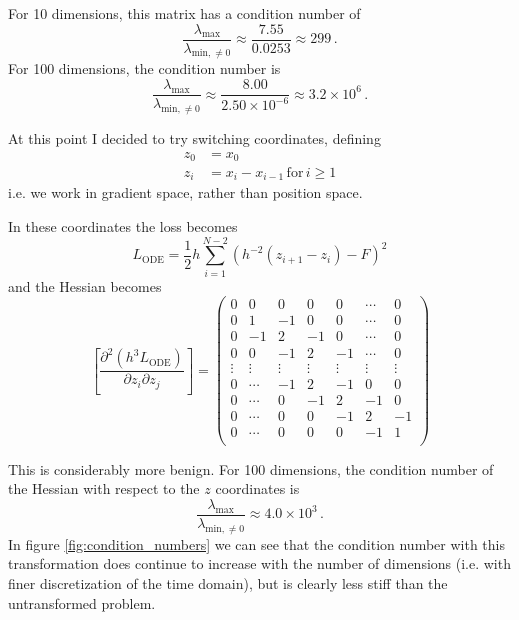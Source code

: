 \documentclass{article}
\begin{document}
For 10 dimensions, this matrix has a condition number of
$$
\frac{\lambda_{\mathrm{max}}}{\lambda_{\mathrm{min}, \ne 0}} \approx \frac{7.55}{0.0253} \approx 299 \,.
$$
For 100 dimensions, the condition number is
$$
\frac{\lambda_{\mathrm{max}}}{\lambda_{\mathrm{min}, \ne 0}} \approx \frac{8.00}{2.50\times 10^{-6}} \approx 3.2 \times 10^6 \,.
$$

At this point I decided to try switching coordinates, defining
\begin{align}
\label{eq:zdef}
z_0 & = x_0 \nonumber \\
z_i & = x_i - x_{i-1} \, \mathrm{for} \, i \ge 1 
\end{align}
i.e. we work in gradient space, rather than position space.

In these coordinates the loss becomes 
$$
L_{\mathrm{ODE}} = \frac{1}{2} h \sum_{i=1}^{N-2} \left( h^{-2}(z_{i+1} - z_i) - F \right)^2 
$$
and the Hessian becomes
$$
\left[\frac{\partial^2 (h^3 L_{\mathrm{ODE}})}{\partial z_i \partial z_j} \right] = \begin{pmatrix}
0 & 0 & 0 & 0 & 0 & \cdots & 0 \\
0 & 1 & -1 & 0 & 0 & \cdots & 0 \\
0 & -1 & 2 & -1 & 0 & \cdots & 0 \\
0 & 0 & -1 & 2 & -1 & \cdots & 0 \\
\vdots & \vdots & \vdots & \vdots & \vdots & \vdots & \vdots \\
0 & \cdots & -1 & 2 & -1 & 0 & 0 \\
0 & \cdots & 0 & -1 & 2 & -1 & 0 \\
0 & \cdots & 0 & 0 & -1 & 2 & -1 \\
0 & \cdots & 0 & 0 & 0 & -1 & 1 \\
\end{pmatrix}
$$

This is considerably more benign. For 100 dimensions, the condition number of the Hessian with respect to the $z$ coordinates is
$$
\frac{\lambda_{\mathrm{max}}}{\lambda_{\mathrm{min}, \ne 0}} \approx 4.0 \times 10^3 \,.
$$
In figure \ref{fig:condition_numbers} we can see that the condition number with this transformation does continue to increase with the number of dimensions (i.e. with finer discretization of the time domain), but is clearly less stiff than the untransformed problem.
\end{document}
